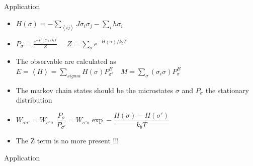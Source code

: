 \documentclass{beamer}
\begin{document}
\begin{frame}{Application \cite{peliti2011statistical}}

\begin{itemize}
\item $H(\sigma)=-\sum_{\left\langle ij \right\rangle}J\sigma_{i}\sigma_{j}-\sum_{i}h\sigma_{i}$
\item $P_{\sigma}=\frac{e^{-H(\sigma)/k_{b}T}}{Z}$  $\quad Z=\sum_{\sigma}e^{-H(\sigma)/k_{b}T}$
\item The observable are calculated as $E=\left\langle H \right\rangle=\sum_{sigma}H(\sigma)P_{\sigma'}^{B} \quad M=\sum_{\sigma}\left(\sigma_{i} \sigma\right)P_{\sigma}^{B}  $
\item The markov chain states should be the microstates $\sigma$ and $P_{\sigma}$ the stationary distribution 
\item $W_{\sigma\sigma '} = W_{\sigma ' \sigma}$ $\dfrac{P_{\sigma}}{P_{\sigma '}}=W_{\sigma ' \sigma} \exp - \dfrac{H(\sigma)-H(\sigma ')}{k_{b}T}$
\item The Z term is no more present !!!
\end{itemize}

\end{frame}

\begin{frame}{Application \cite{peliti2011statistical}}


\end{frame}
\end{document}

